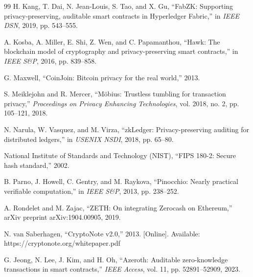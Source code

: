 \documentclass[conference]{IEEEtran}
\begin{document}
\begin{thebibliography}{99}
H. Kang, T. Dai, N. Jean-Louis, S. Tao, and X. Gu, ``FabZK: Supporting privacy-preserving, auditable smart contracts in Hyperledger Fabric,'' in \textit{IEEE DSN}, 2019, pp. 543--555.

A. Kosba, A. Miller, E. Shi, Z. Wen, and C. Papamanthou, ``Hawk: The blockchain model of cryptography and privacy-preserving smart contracts,'' in \textit{IEEE S&P}, 2016, pp. 839--858.

G. Maxwell, ``CoinJoin: Bitcoin privacy for the real world,'' 2013.

S. Meiklejohn and R. Mercer, ``Möbius: Trustless tumbling for transaction privacy,'' \textit{Proceedings on Privacy Enhancing Technologies}, vol. 2018, no. 2, pp. 105--121, 2018.

N. Narula, W. Vasquez, and M. Virza, ``zkLedger: Privacy-preserving auditing for distributed ledgers,'' in \textit{USENIX NSDI}, 2018, pp. 65--80.

National Institute of Standards and Technology (NIST), ``FIPS 180-2: Secure hash standard,'' 2002.

B. Parno, J. Howell, C. Gentry, and M. Raykova, ``Pinocchio: Nearly practical verifiable computation,'' in \textit{IEEE S&P}, 2013, pp. 238--252.

A. Rondelet and M. Zajac, ``ZETH: On integrating Zerocash on Ethereum,'' arXiv preprint arXiv:1904.00905, 2019.

N. van Saberhagen, ``CryptoNote v2.0,'' 2013. [Online]. Available: https://cryptonote.org/whitepaper.pdf

G. Jeong, N. Lee, J. Kim, and H. Oh, ``Azeroth: Auditable zero-knowledge transactions in smart contracts,'' \textit{IEEE Access}, vol. 11, pp. 52891--52909, 2023.

\end{thebibliography}
\end{document}
